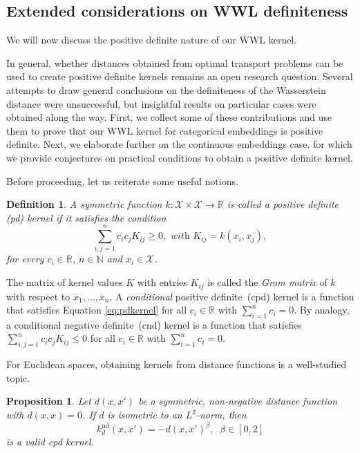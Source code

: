 \documentclass{article}
\newtheorem{definition}{Definition}
\newtheorem{proposition}{Proposition}
\begin{document}
\subsection{Extended considerations on WWL definiteness}
\label{app:definiteness}

We will now discuss the positive definite nature of our WWL kernel. 

In general, whether distances obtained from optimal transport problems can be used to create positive definite kernels remains an open research question. Several attempts to draw general conclusions on the definiteness of the Wasserstein distance were unsuccessful, but insightful results on particular cases were obtained along the way. 
First, we collect some of these contributions and use them to prove that our WWL kernel for categorical embeddings is positive definite. 
Next, we elaborate further on the continuous embeddings case, for which we provide conjectures on practical conditions to obtain a positive definite kernel.

Before proceeding, let us reiterate some useful notions.
\begin{definition} \cite{scholkopf2002learning}
A symmetric function $k\colon \mathcal{X} \times \mathcal{X} \to \mathbb{R}$ is called a \textup{positive definite (pd) kernel} if it satisfies the condition
\begin{equation}
\label{eq:pdkernel}
\sum_{i,j=1}^{n}c_ic_jK_{ij} \geq 0, \, \, \textit{with} \, \, K_{ij} = k(x_i,x_j),
\end{equation}
for every $c_i\in\mathbb{R}$, $n\in\mathbb{N}$ and $x_{i}\in \mathcal{X}$.
\end{definition}

The matrix of kernel values $K$ with entries $K_{ij}$ is called the \emph{Gram matrix} of $k$ with respect to $x_1,\ldots,x_n$. A \textit{conditional} positive definite~(cpd) kernel is a function that satisfies Equation \ref{eq:pdkernel} for all $c_i \in \mathbb{R}$ with $\sum_{i=1}^n c_i = 0$. 
By analogy, a conditional negative definite~(cnd) kernel is a function that satisfies $\sum_{i,j=1}^{n}c_ic_jK_{ij} \leq 0$ for all $c_i \in \mathbb{R}$ with $\sum_{i=1}^n c_i = 0$.

For Euclidean spaces, obtaining kernels from distance functions is a well-studied topic.

\begin{proposition}
\citep{haasdonk2004learning}
\label{prop:haasdonk}
Let $d(x,x')$ be a symmetric, non-negative distance function with $d(x,x)=0$. If $d$ is isometric to an $L^2$-norm, then 
\begin{equation}
  k_d^{\mathrm{nd}}(x,x') = -d(x,x')^\beta, \;\;\beta \in \left [ 0, 2 \right ]
\end{equation}
is a valid cpd kernel.
\end{proposition}
\end{document}
